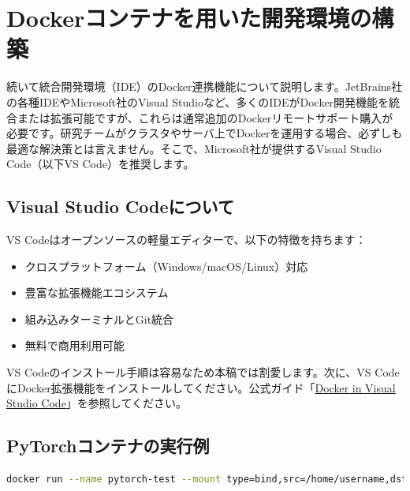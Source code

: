 \section{Dockerコンテナを用いた開発環境の構築}
続いて統合開発環境（IDE）のDocker連携機能について説明します。JetBrains社の各種IDEやMicrosoft社のVisual Studioなど、多くのIDEがDocker開発機能を統合または拡張可能ですが、これらは通常追加のDockerリモートサポート購入が必要です。研究チームがクラスタやサーバ上でDockerを運用する場合、必ずしも最適な解決策とは言えません。そこで、Microsoft社が提供するVisual Studio Code（以下VS Code）を推奨します。

\subsection*{Visual Studio Codeについて}
VS Codeはオープンソースの軽量エディターで、以下の特徴を持ちます：
\begin{itemize}
\item クロスプラットフォーム（Windows/macOS/Linux）対応
\item 豊富な拡張機能エコシステム
\item 組み込みターミナルとGit統合
\item 無料で商用利用可能
\end{itemize}

VS Codeのインストール手順は容易なため本稿では割愛します。次に、VS CodeにDocker拡張機能をインストールしてください。公式ガイド「\href{https://code.visualstudio.com/docs/containers/overview}{Docker in Visual Studio Code}」を参照してください。

\subsection{PyTorchコンテナの実行例}
\begin{lstlisting}[language=bash]
docker run --name pytorch-test --mount type=bind,src=/home/username,dst=/root/ --gpus all --ipc=host -it nvcr.io/nvidia/pytorch:xx.xx-py3
\end{lstlisting}

